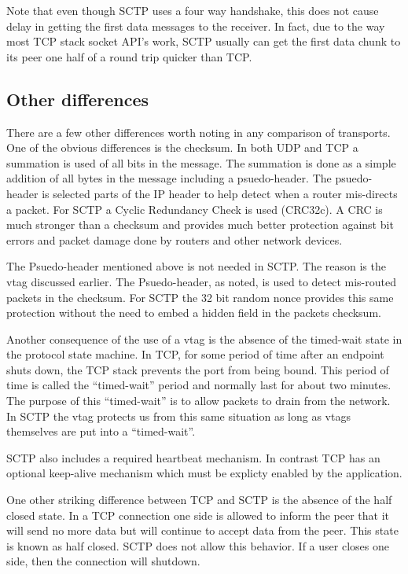 \documentclass[conference]{IEEEtran}
\begin{document}
Note that even though SCTP uses a four way handshake, this does not
cause delay in getting the first data messages to the receiver. In fact,
due to the way most TCP stack socket API's work, SCTP usually can get
the first data chunk to its peer one half of a round trip quicker than TCP.

\subsection{Other differences}
\label{miscdiff}

There are a few other differences worth noting in any comparison of
transports. One of the obvious differences is the checksum. In both
UDP and TCP a summation is used of all bits in the message. The summation
is done as a simple addition of all bytes in the message including a
psuedo-header. The psuedo-header is selected parts of the IP
header to help detect when a router mis-directs a packet. For SCTP
a Cyclic Redundancy Check is used (CRC32c). A CRC is much stronger
than a checksum and provides much better protection against
bit errors and packet damage done by routers and other network
devices. 

The Psuedo-header mentioned above is not needed in SCTP. The reason
is the vtag discussed earlier. The Psuedo-header, as noted, is used to
detect mis-routed packets in the checksum. For SCTP the 32 bit random
nonce provides this same protection without the need to embed a
hidden field in the packets checksum.

Another consequence of the use of a vtag is the absence of 
the timed-wait state in the protocol state machine. In TCP, for
some period of time after an endpoint shuts down, the TCP stack
prevents the port from being bound. This period of time is called
the ``timed-wait'' period and normally last for about
two minutes.  The purpose of this ``timed-wait'' is to allow
packets to drain from the network. In SCTP the vtag protects
us from this same situation as long as vtags themselves are
put into a ``timed-wait''.

SCTP also includes a required heartbeat mechanism. In contrast
TCP has an optional keep-alive mechanism which must be explicty
enabled by the application. 

One other striking difference between TCP and SCTP is the absence
of the half closed state. In a TCP connection one side is allowed to
inform the peer that it will send no more data but will continue to accept
data from the peer. This state is known as half closed. SCTP does not
allow this behavior. If a user closes one side, then the connection will
shutdown.
\end{document}
